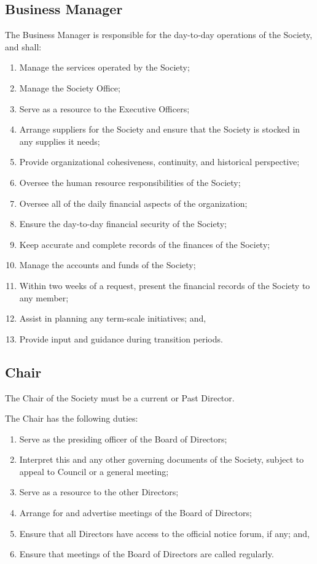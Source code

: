 \subsection{Business Manager}
The Business Manager is responsible for the day-to-day operations of the 
Society, and shall:
\begin{enumerate}
    \item Manage the services operated by the Society;
    \item Manage the Society Office;
    \item Serve as a resource to the Executive Officers;
    \item Arrange suppliers for the Society and ensure that the Society is
        stocked in any supplies it needs;
    \item Provide organizational cohesiveness, continuity, and historical
        perspective;
    \item Oversee the human resource responsibilities of the Society;
    \item Oversee all of the daily financial aspects of the organization;
    \item Ensure the day-to-day financial security of the Society;
    \item Keep accurate and complete records of the finances of the Society;
    \item Manage the accounts and funds of the Society;
    \item Within two weeks of a request, present the financial records of the
        Society to any member;
    \item Assist in planning any term-scale initiatives; and,
    \item Provide input and guidance during transition periods.
\end{enumerate}

\subsection{Chair}
The Chair of the Society must be a current or Past Director.

The Chair has the following duties:
\begin{enumerate}
    \item Serve as the presiding officer of the Board of Directors;
    \item Interpret this and any other governing documents of the Society,
        subject to appeal to Council or a general meeting;
    \item Serve as a resource to the other Directors;
    \item Arrange for and advertise meetings of the Board of Directors;
    \item Ensure that all Directors have access to the official notice
        forum, if any; and,
    \item Ensure that meetings of the Board of Directors are called regularly.
\end{enumerate}

